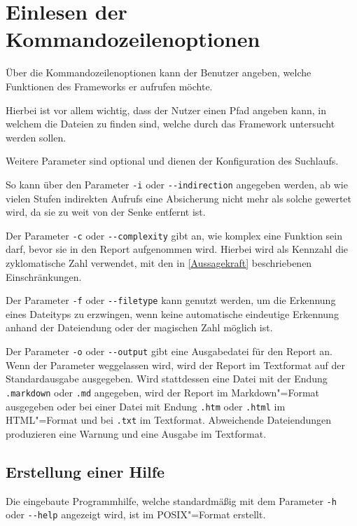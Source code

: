     \section{Einlesen der Kommandozeilenoptionen}\label{Einlesen der Kommandozeilenoptionen}
        Über die Kommandozeilenoptionen kann der Benutzer angeben,
        welche Funktionen des Frameworks er aufrufen möchte.

        Hierbei ist vor allem wichtig,
        dass der Nutzer einen Pfad angeben kann,
        in welchem die Dateien zu finden sind,
        welche durch das Framework untersucht werden sollen.

        Weitere Parameter sind optional und
        dienen der Konfiguration des Suchlaufs.

        So kann über den Parameter
        \lstinline{-i} oder
        \lstinline{--indirection} angegeben werden,
        ab wie vielen Stufen indirekten Aufrufs eine Absicherung nicht mehr als solche gewertet wird,
        da sie zu weit von der Senke entfernt ist.

        Der Parameter
        \lstinline{-c} oder
        \lstinline{--complexity} gibt an,
        wie komplex eine Funktion sein darf,
        bevor sie in den Report aufgenommen wird.
        Hierbei wird als Kennzahl die zyklomatische Zahl verwendet,
        mit den in
        \vref{Aussagekraft} beschriebenen Einschränkungen.

        Der Parameter
        \lstinline{-f} oder
        \lstinline{--filetype} kann genutzt werden,
        um die Erkennung eines Dateityps zu erzwingen,
        wenn keine automatische eindeutige Erkennung anhand der Dateiendung oder
        der magischen Zahl möglich ist.

        Der Parameter
        \lstinline{-o} oder
        \lstinline{--output} gibt eine Ausgabedatei für den Report an.
        Wenn der Parameter weggelassen wird,
        wird der Report im Textformat auf der Standardausgabe ausgegeben.
        Wird stattdessen eine Datei mit der Endung
        \lstinline{.markdown} oder
        \lstinline{.md} angegeben,
        wird der Report im Markdown"=Format ausgegeben oder
        bei einer Datei mit Endung
        \lstinline{.htm} oder
        \lstinline{.html} im
        \gls{HTML}"=Format und
        bei
        \lstinline{.txt} im Textformat.
        Abweichende Dateiendungen produzieren eine Warnung und
        eine Ausgabe im Textformat.

        \subsection{Erstellung einer Hilfe}
            Die eingebaute Programmhilfe,
            welche standardmäßig mit dem Parameter
            \lstinline{-h} oder
            \lstinline{--help} angezeigt wird,
            ist im
            \gls{POSIX}"=Format erstellt.\cite{OpenGroup2018}

